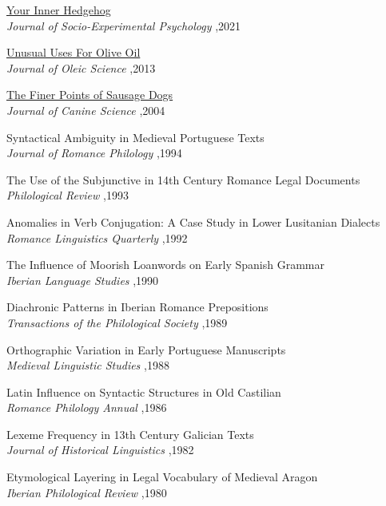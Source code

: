 \documentclass[letterpaper,10pt]{article}
\begin{document}
\begin{etaremune}
\item \href{https://pascalmichaillat.org/hugo-website/papers/paper3/}{Your Inner Hedgehog} \\
\textit{Journal of Socio-Experimental Psychology} \sep 2021
\item \href{https://pascalmichaillat.org/hugo-website/papers/paper1/}{Unusual Uses For Olive Oil} \\
\textit{Journal of Oleic Science} \sep 2013
\item \href{https://pascalmichaillat.org/hugo-website/papers/paper2/}{The Finer Points of Sausage Dogs} \\
\textit{Journal of Canine Science} \sep 2004
\item Syntactical Ambiguity in Medieval Portuguese Texts \\
\textit{Journal of Romance Philology} \sep 1994
\item The Use of the Subjunctive in 14th Century Romance Legal Documents\\
 \textit{Philological Review} \sep 1993
\item Anomalies in Verb Conjugation: A Case Study in Lower Lusitanian Dialects\\
\textit{Romance Linguistics Quarterly} \sep 1992
\item The Influence of Moorish Loanwords on Early Spanish Grammar\\
\textit{Iberian Language Studies} \sep 1990
\item Diachronic Patterns in Iberian Romance Prepositions\\
\textit{Transactions of the Philological Society} \sep 1989
\item Orthographic Variation in Early Portuguese Manuscripts\\
\textit{Medieval Linguistic Studies} \sep 1988
\item Latin Influence on Syntactic Structures in Old Castilian\\
\textit{Romance Philology Annual} \sep 1986
\item Lexeme Frequency in 13th Century Galician Texts \\
\textit{Journal of Historical Linguistics} \sep 1982
\item Etymological Layering in Legal Vocabulary of Medieval Aragon \\
\textit{Iberian Philological Review} \sep 1980
\end{etaremune}
\end{document}
